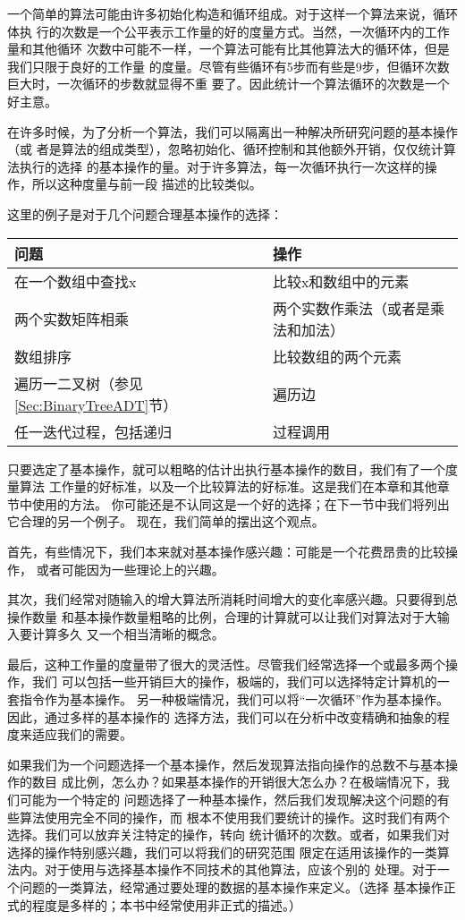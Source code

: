 一个简单的算法可能由许多初始化构造和循环组成。对于这样一个算法来说，循环体执
行的次数是一个公平表示工作量的好的度量方式。当然，一次循环内的工作量和其他循环
次数中可能不一样，一个算法可能有比其他算法大的循环体，但是我们只限于良好的工作量
的度量。尽管有些循环有5步而有些是9步，但循环次数巨大时，一次循环的步数就显得不重
要了。因此统计一个算法循环的次数是一个好主意。

在许多时候，为了分析一个算法，我们可以隔离出一种解决所研究问题的基本操作（或
者是算法的组成类型），忽略初始化、循环控制和其他额外开销，仅仅统计算法执行的选择
的基本操作的量。对于许多算法，每一次循环执行一次这样的操作，所以这种度量与前一段
描述的比较类似。

这里的例子是对于几个问题合理基本操作的选择：

\begin{tabular}{ll}
\hline
问题  &操作 \\
\hline
在一个数组中查找x &比较x和数组中的元素\\
两个实数矩阵相乘    &两个实数作乘法（或者是乘法和加法）\\
数组排序 &比较数组的两个元素\\
遍历一二叉树（参见\ref{Sec:BinaryTreeADT}节） &遍历边\\
任一迭代过程，包括递归 &过程调用\\
\hline
\end{tabular}

\noindent
只要选定了基本操作，就可以粗略的估计出执行基本操作的数目，我们有了一个度量算法
工作量的好标准，以及一个比较算法的好标准。这是我们在本章和其他章节中使用的方法。
你可能还是不认同这是一个好的选择；在下一节中我们将列出它合理的另一个例子。
现在，我们简单的摆出这个观点。

首先，有些情况下，我们本来就对基本操作感兴趣：可能是一个花费昂贵的比较操作，
或者可能因为一些理论上的兴趣。

其次，我们经常对随输入的增大算法所消耗时间增大的变化率感兴趣。只要得到总操作数量
和基本操作数量粗略的比例，合理的计算就可以让我们对算法对于大输入要计算多久
又一个相当清晰的概念。

最后，这种工作量的度量带了很大的灵活性。尽管我们经常选择一个或最多两个操作，我们
可以包括一些开销巨大的操作，极端的，我们可以选择特定计算机的一套指令作为基本操作。
另一种极端情况，我们可以将“一次循环”作为基本操作。因此，通过多样的基本操作的
选择方法，我们可以在分析中改变精确和抽象的程度来适应我们的需要。

如果我们为一个问题选择一个基本操作，然后发现算法指向操作的总数不与基本操作的数目
成比例，怎么办？如果基本操作的开销很大怎么办？在极端情况下，我们可能为一个特定的
问题选择了一种基本操作，然后我们发现解决这个问题的有些算法使用完全不同的操作，而
根本不使用我们要统计的操作。这时我们有两个选择。我们可以放弃关注特定的操作，转向
统计循环的次数。或者，如果我们对选择的操作特别感兴趣，我们可以将我们的研究范围
限定在适用该操作的一类算法内。对于使用与选择基本操作不同技术的其他算法，应该个别的
处理。对于一个问题的一类算法，经常通过要处理的数据的基本操作来定义。（选择
基本操作正式的程度是多样的；本书中经常使用非正式的描述。）


